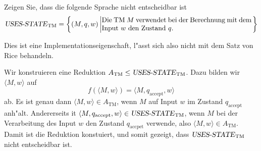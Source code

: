 Zeigen Sie, dass die folgende  Sprache nicht entscheidbar ist
\[
\text{\textsl{USES-STATE}}_{\text{TM}}=
\left\{
(M,q,w)\left|
\begin{minipage}{3truein}Die TM $M$ verwendet bei der Berechnung mit
dem Input $w$ den Zustand $q$.
\end{minipage}\right.
\right\}
\]

\begin{hinweis}
Dies ist eine Implementationseigenschaft, l"asst sich
also nicht mit dem Satz von Rice behandeln.
\end{hinweis}

\begin{loesung}
Wir konstruieren eine Reduktion
$A_{\text{TM}}\le \text{\textsl{USES-STATE}}_{\text{TM}}$.
Dazu bilden wir
$\langle M,w\rangle$
auf
\[
f(\langle M,w\rangle)=
\langle M,q_{\text{accept}},w\rangle
\]
ab. Es ist genau dann
$\langle M,w\rangle\in A_{\text{TM}}$, wenn $M$ auf Input $w$ im
Zustand $q_{\text{accept}}$ anh"alt. Andererseits it
$\langle M,q_{\text{accept}},w\rangle\in 
\text{\textsl{USES-STATE}}_{\text{TM}}$, wenn $M$ bei der Verarbeitung
des Input $w$ den Zustand $q_{\text{accpet}}$ verwende, also
$\langle M,w\rangle\in A_{\text{TM}}$. Damit ist die Reduktion
konstuiert, und somit gezeigt, dass
$\text{\textsl{USES-STATE}}_{\text{TM}}$ nicht entscheidbar ist.
\end{loesung}
